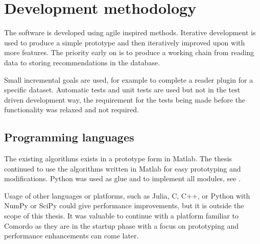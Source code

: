 \section{Development methodology}

The software is developed using agile inspired methods. Iterative development is used to produce a simple prototype and then iteratively improved upon with more features.  The priority early on is to produce a working chain from reading data to storing recommendations in the database.

Small incremental goals are used, for example to complete a reader plugin for a specific dataset.  Automatic tests and unit tests are used but not in the test driven development way, the requirement for the tests being made before the functionality was relaxed and not required.


\subsection{Programming languages}

The existing algorithms exists in a prototype form in Matlab. The thesis continued to use the algorithms written in Matlab for easy prototyping and modifications. Python was used as glue and to implement all modules, see .

Usage of other languages or platforms, such as Julia, C, C++, or Python with NumPy or SciPy could give performance improvements, but it is outside the scope of this thesis.  It was valuable to continue with a platform familiar to Comordo as they are in the startup phase with a focus on prototyping and performance enhancements can come later.

